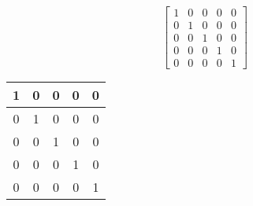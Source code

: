 \begin{equation}
\label{equ:prova}
\left[\begin{array}{ccccc}1 & 0 & 0 & 0 & 0 \\0 & 1 & 0 & 0 & 0 \\0 & 0 & 1 & 0 & 0 \\0 & 0 & 0 & 1 & 0 \\0 & 0 & 0 & 0 & 1\end{array}\right]
\end{equation}

\begin{centering}
\begin{tabular}{|c|c|c|c|c|}\hline 1 & 0 & 0 & 0 & 0 \\\hline 0 & 1 & 0 & 0 & 0 \\\hline 0 & 0 & 1 & 0 & 0 \\\hline 0 & 0 & 0 & 1 & 0 \\\hline 0 & 0 & 0 & 0 & 1 \\\hline \end{tabular}
\end{centering}
